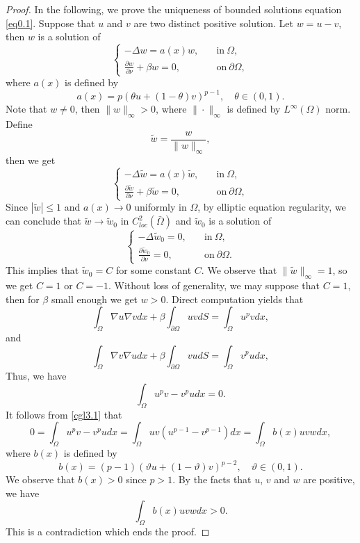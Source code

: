 \documentclass[12pt,reqno]{amsart}
\numberwithin{equation}{section}
\theoremstyle{definition}
\begin{document}
\begin{proof}
In the following, we prove the uniqueness of bounded solutions equation \eqref{eq0.1}.
Suppose that $u$ and $v$ are two distinct positive solution. Let $w=u-v$, then $w$ is a solution of 
\begin{equation*}
\begin{cases}
-\Delta w=a(x)w,\quad &\text{in}\ \Omega,\\
\frac{\partial w}{\partial \nu}+\beta w=0, &\text{on}\ \partial\Omega,
\end{cases}
\end{equation*}
where $a(x)$ is defined by 
$$
a(x)=p(\theta u+(1-\theta)v)^{p-1}, \quad \theta\in(0,1).
$$
Note that $w\neq 0$, then $\|w\|_\infty>0$, where $\|\cdot\|_\infty$ is defined by $L^\infty(\Omega)$ norm. Define 
$$
\tilde{w}=\frac{w}{\|w\|_\infty},
$$
then we get 
\begin{equation*}
\begin{cases}
-\Delta \tilde{w}=a(x)\tilde{w},\quad &\text{in}\ \Omega,\\
\frac{\partial \tilde{w}}{\partial \nu}+\beta \tilde{w}=0, &\text{on}\ \partial\Omega,
\end{cases}
\end{equation*}
Since  $|\tilde{w}|\le 1$ and $a(x)\to 0$ uniformly in $\Omega$,  by elliptic equation regularity, we can conclude that $\tilde{w}\to \tilde{w}_0$ in $C_{loc}^2(\bar{\Omega})$ and $\tilde{w}_0$ is a solution of 
\begin{equation*}
\begin{cases}
-\Delta \tilde{w}_0=0,\quad &\text{in}\ \Omega,\\
\frac{\partial \tilde{w}_0}{\partial \nu}=0, &\text{on}\ \partial\Omega.
\end{cases}
\end{equation*}
This implies that $\tilde{w}_0=C$ for some constant $C$. We observe that $\|\tilde{w}\|_\infty=1$, so we get $C=1$ or $C=-1$. 
Without loss of generality, we may suppose that $C=1$, then for $\beta$ small enough we get $w>0$. 
Direct computation yields that 
$$
\int_{\Omega}\nabla u\nabla vdx+\beta\int_{\partial\Omega}uvdS=\int_{\Omega}u^pvdx, 
$$
and
$$
\int_{\Omega}\nabla v\nabla udx+\beta\int_{\partial\Omega}vudS=\int_{\Omega}v^pudx, 
$$
Thus, we have 
\begin{equation}\label{cgl3.1}
\int_{\Omega}u^pv-v^pudx=0.
\end{equation}
It follows from \eqref{cgl3.1} that 
\begin{equation*}
0=\int_{\Omega}u^pv-v^pudx=\int_{\Omega}uv(u^{p-1}-v^{p-1})dx=\int_{\Omega}b(x)uvwdx, 
\end{equation*}
where $b(x)$ is defined by 
$$
b(x)=(p-1)(\vartheta u+(1-\vartheta)v)^{p-2}, \quad \vartheta\in(0,1).
$$
We observe that  $b(x)>0$ since $p>1$.  By the facts that $u$, $v$ and $w$ are positive, we have 
\begin{equation*}
\int_{\Omega}b(x)uvwdx>0.
\end{equation*}
This is a contradiction which ends the proof.
\end{proof}
\end{document}
